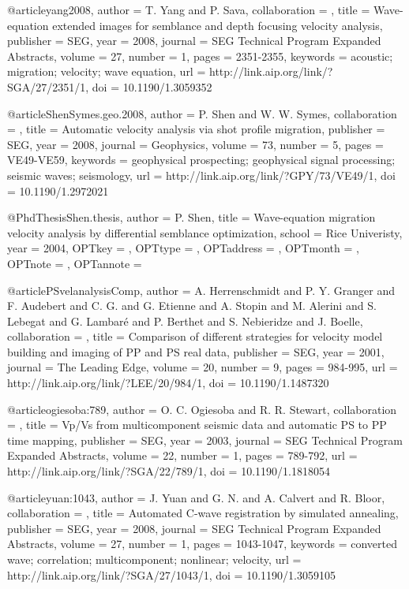 @article{yang2008,
author = {T. Yang and P. Sava},
collaboration = {},
title = {Wave-equation extended images for semblance and depth focusing velocity analysis},
publisher = {SEG},
year = {2008},
journal = {SEG Technical Program Expanded Abstracts},
volume = {27},
number = {1},
pages = {2351-2355},
keywords = {acoustic; migration; velocity; wave equation},
url = {http://link.aip.org/link/?SGA/27/2351/1},
doi = {10.1190/1.3059352}
}

@article{ShenSymes.geo.2008,
author = {P. Shen and W. W. Symes},
collaboration = {},
title = {Automatic velocity analysis via shot profile migration},
publisher = {SEG},
year = {2008},
journal = {Geophysics},
volume = {73},
number = {5},
pages = {VE49-VE59},
keywords = {geophysical prospecting; geophysical signal processing; seismic waves; seismology},
url = {http://link.aip.org/link/?GPY/73/VE49/1},
doi = {10.1190/1.2972021}
}

@PhdThesis{Shen.thesis,
  author = 	 {P. Shen},
  title = 	 {Wave-equation migration velocity analysis by
                  differential semblance optimization},
  school = 	 {Rice Univeristy},
  year = 	 {2004},
  OPTkey = 	 {},
  OPTtype = 	 {},
  OPTaddress = 	 {},
  OPTmonth = 	 {},
  OPTnote = 	 {},
  OPTannote = 	 {}
}

@article{PSvelanalysisComp,
author = {A. Herrenschmidt and P. Y. Granger and
                  F. Audebert and C. G. and
                  G. Etienne and A. Stopin and M.
                  Alerini and S. Lebegat and G. Lambar\'{e}
                  and P. Berthet and S. Nebieridze and
                  J. Boelle},
collaboration = {},
title = {Comparison of different strategies for velocity model
                  building and imaging of {PP} and {PS} real data},
publisher = {SEG},
year = {2001},
journal = {The Leading Edge},
volume = {20},
number = {9},
pages = {984-995},
url = {http://link.aip.org/link/?LEE/20/984/1},
doi = {10.1190/1.1487320}
}

@article{ogiesoba:789,
author = {O. C. Ogiesoba and R. R. Stewart},
collaboration = {},
title = {Vp/{V}s from multicomponent seismic data and automatic {PS}
                  to {PP} time mapping},
publisher = {SEG},
year = {2003},
journal = {SEG Technical Program Expanded Abstracts},
volume = {22},
number = {1},
pages = {789-792},
url = {http://link.aip.org/link/?SGA/22/789/1},
doi = {10.1190/1.1818054}
}

@article{yuan:1043,
author = {J. Yuan and G. N. and A. Calvert and
                  R. Bloor},
collaboration = {},
title = {Automated {C}-wave registration by simulated annealing},
publisher = {SEG},
year = {2008},
journal = {SEG Technical Program Expanded Abstracts},
volume = {27},
number = {1},
pages = {1043-1047},
keywords = {converted wave; correlation; multicomponent; nonlinear;
                  velocity},
url = {http://link.aip.org/link/?SGA/27/1043/1},
doi = {10.1190/1.3059105}
}

